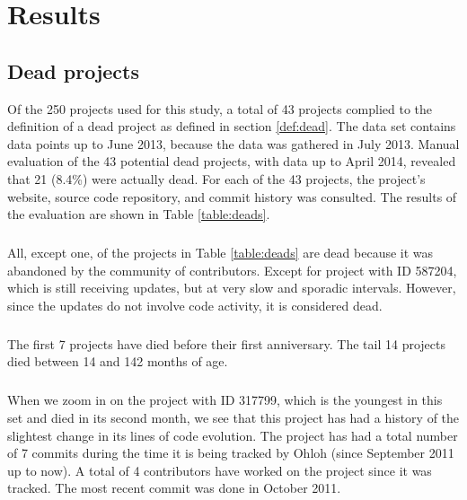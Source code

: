 \chapter{Results}
\label{results}

\section{Dead projects}
\label{section:deads}
Of the 250 projects used for this study, a total of 43 projects complied to the
definition of a dead project as defined in section \ref{def:dead}. The data set
contains data points up to June 2013, because the data was gathered in July
2013. Manual evaluation of the 43 potential dead projects, with data up to April
2014, revealed that 21 (8.4\%) were actually dead.
For each of the 43 projects, the project's website, source code repository, and
commit history was consulted. The results of the evaluation are shown in Table
\ref{table:deads}.



\paragraph{}
All, except one, of the projects in Table \ref{table:deads} are dead because it
was abandoned by the community of contributors. Except for project with ID
587204, which is still receiving updates, but at very slow and sporadic
intervals. However, since the updates do not involve code activity, it is
considered dead.

\paragraph{}
The first 7 projects have died before their first anniversary. The tail 14
projects died between 14 and 142 months of age.

\paragraph{}
When we zoom in on the project with ID 317799, which is the youngest in this set
and died in its second month, we see that this project has had a history of the
slightest change in its lines of code evolution. The project has had a total
number of 7 commits during the time it is being tracked by Ohloh (since
September 2011 up to now). A total of 4 contributors have worked on the project
since it was tracked. The most recent commit was done in October 2011.

